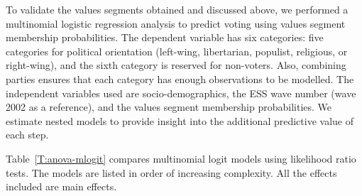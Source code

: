 \documentclass[12pt,letter]{article}\usepackage[]{graphicx}\usepackage[]{xcolor}
\begin{document}
To validate the values segments obtained and discussed above, we performed a multinomial logistic regression analysis to predict voting using values segment membership probabilities. The dependent variable has six categories: five categories for political orientation (left-wing, libertarian, populist, religious, or right-wing), and the sixth category is reserved for non-voters. Also, combining parties ensures that each category has enough observations to be modelled. The independent variables used are socio-demographics, the ESS wave number (wave 2002 as a reference), and the values segment membership probabilities. We estimate nested models to provide insight into the additional predictive value of each step.

Table~\ref{T:anova-mlogit} compares multinomial logit models using likelihood ratio tests. The models are listed in order of increasing complexity. All the effects included are main effects.
\end{document}

